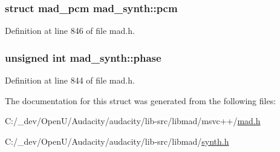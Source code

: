 \subsubsection[{\texorpdfstring{pcm}{pcm}}]{\setlength{\rightskip}{0pt plus 5cm}struct {\bf mad\+\_\+pcm} mad\+\_\+synth\+::pcm}\hypertarget{structmad__synth_a4722ec26c24589445c49b9c823a9366b}{}\label{structmad__synth_a4722ec26c24589445c49b9c823a9366b}


Definition at line 846 of file mad.\+h.

\subsubsection[{\texorpdfstring{phase}{phase}}]{\setlength{\rightskip}{0pt plus 5cm}unsigned {\bf int} mad\+\_\+synth\+::phase}\hypertarget{structmad__synth_a58063ab3020085d470a8cc460bca39a7}{}\label{structmad__synth_a58063ab3020085d470a8cc460bca39a7}


Definition at line 844 of file mad.\+h.



The documentation for this struct was generated from the following files\+:\begin{DoxyCompactItemize}
\item 
C\+:/\+\_\+dev/\+Open\+U/\+Audacity/audacity/lib-\/src/libmad/msvc++/\hyperlink{lib-src_2libmad_2msvc_09_09_2mad_8h}{mad.\+h}\item 
C\+:/\+\_\+dev/\+Open\+U/\+Audacity/audacity/lib-\/src/libmad/\hyperlink{synth_8h}{synth.\+h}\end{DoxyCompactItemize}
